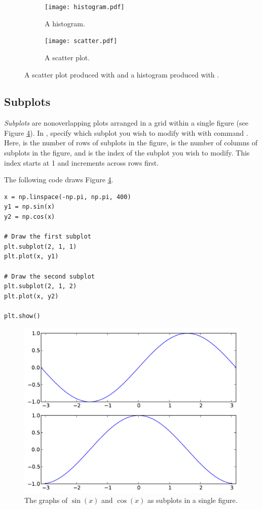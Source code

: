 \begin{figure}
\centering
\begin{subfigure}[t]{.49\textwidth}
\centering
\texttt{[image: histogram.pdf]}
\caption{A histogram.}
\label{fig:histogram}
\end{subfigure}
\begin{subfigure}[t]{.49\textwidth}
\centering
\texttt{[image: scatter.pdf]}
\caption{A scatter plot.}
\label{fig:scatter}
\end{subfigure}
\caption{A scatter plot produced with  and a histogram produced with .}
\label{fig:otherplots}
\end{figure}


\subsection*{Subplots}
\emph{Subplots} are nonoverlapping plots arranged in a grid within a single figure (see Figure \ref{fig:subplots}).
In , specify which subplot you wish to modify with with command .
Here,  is the number of rows of subplots in the figure,  is the number of columns of subplots in the figure, and  is the index of the subplot you wish to modify.
This index starts at 1 and increments across rows first.

The following code draws Figure \ref{fig:subplots}.
\begin{lstlisting}
x = np.linspace(-np.pi, np.pi, 400)
y1 = np.sin(x)
y2 = np.cos(x)

# Draw the first subplot
plt.subplot(2, 1, 1)
plt.plot(x, y1)

# Draw the second subplot
plt.subplot(2, 1, 2)
plt.plot(x, y2)

plt.show()
\end{lstlisting}

\begin{figure}
\includegraphics[width=.7\textwidth]{subplots.pdf}
\caption{The graphs of $\sin(x)$ and $\cos(x)$ as subplots in a single figure.}
\label{fig:subplots}
\end{figure}

